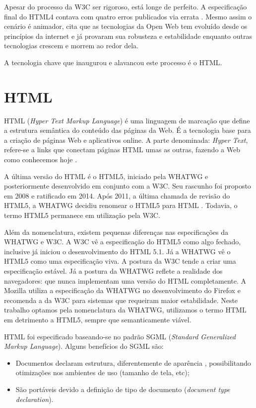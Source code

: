 Apesar do processo da W3C ser rigoroso, está longe de perfeito. A
especificação final do HTML4 contava com quatro erros publicados
via errata \autocite{diveIntohtml}. Mesmo assim o cenário é animador,
\citet{html5mostwanted} cita que as tecnologias da Open Web tem
evoluído desde os princípios da internet e já provaram sua robusteza
e estabilidade enquanto outras tecnologias crescem e morrem ao redor
dela.

A tecnologia chave que inaugurou e alavancou este processo é o HTML.
\section{HTML}

HTML (\textit{Hyper Text Markup Language}) é uma linguagem de
marcação que define a estrutura semântica do conteúdo das páginas
da Web. É a tecnologia base para a criação de páginas Web e
aplicativos online. A parte denominada: \textquotedbl \textit{Hyper Text}\textquotedbl{}, refere-se
a links que conectam páginas HTML umas as outras, fazendo a Web como
conhecemos hoje \autocite{mdn2015}.

A última versão do HTML é o HTML5, iniciado pela WHATWG e
posteriormente desenvolvido em conjunto com a W3C. Seu rascunho foi
proposto em 2008 e ratificado em 2014. Após 2011, a última chamada
de revisão do HTML5, a WHATWG decidiu renomear o HTML5 para HTML
\autocite{htmlIsTheNewHtml5}. Todavia, o termo HTML5 permanece em
utilização pela W3C.

Além da nomenclatura, existem pequenas diferenças nas especificações
da WHATWG e W3C. A W3C vê a especificação do HTML5 como algo fechado,
inclusive já iniciou o desenvolvimento do HTML 5.1. Já a WHATWG vê o
HTML5 como uma especificação viva. A postura da W3C tende a criar uma
especificação estável. Já a postura da WHATWG reflete a realidade dos
navegadores: que nunca implementam uma versão do HTML completamente. A Mozilla
utiliza a especificação da WHATWG no desenvolvimento do Firefox e
recomenda a da W3C para sistemas que requeiram maior estabilidade. Neste
trabalho optamos pela nomenclatura da WHATWG, utilizamos o termo HTML em
detrimento a HTML5, sempre que semanticamente viável.

HTML foi especificado baseando-se no padrão SGML (\textit{Standard Generalized
Markup Language}). Alguns benefícios do SGML são:

\begin{itemize}
    \item Documentos declaram estrutura, diferentemente de aparência
, possibilitando otimizações nos ambientes de uso (tamanho de tela,
etc);
    \item São portáveis devido a definição de tipo de documento
(\textit{document type declaration}).
\end{itemize}


